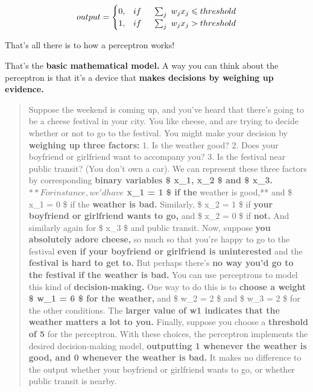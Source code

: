 \documentclass[]{article}
\begin{document}
\begin{equation}  
    output =  
    \begin{cases}
        0,& if \hspace{0.5 cm} \sum_j\ w_jx_j \leqslant threshold \\
        1,& if \hspace{0.5 cm} \sum_j\ w_jx_j > threshold 
    \end{cases}
\end{equation}

That's all there is to how a perceptron works!

That's the \textbf{basic mathematical model.} A way you can think about
the perceptron is that it's a device that \textbf{makes decisions by
weighing up evidence.}

\begin{quote}
Suppose the weekend is coming up, and you've heard that there's going to
be a cheese festival in your city. You like cheese, and are trying to
decide whether or not to go to the festival. You might make your
decision by \textbf{weighing up three factors:} 1. Is the weather good?
2. Does your boyfriend or girlfriend want to accompany you? 3. Is the
festival near public transit? (You don't own a car). We can represent
these three factors by corresponding \textbf{binary variables \$ x\_1,
x\_2 \$ and \$ x\_3. $** For instance, we'd have $ x\_1 = 1 \$ if the
}weather is good,** and \$ x\_1 = 0 \$ if the \textbf{weather is bad.}
Similarly, \$ x\_2 = 1 \$ if \textbf{your boyfriend or girlfriend wants
to go,} and \$ x\_2 = 0 \$ if \textbf{not.} And similarly again for \$
x\_3 \$ and public transit. Now, suppose \textbf{you absolutely adore
cheese,} so much so that you're happy to go to the festival \textbf{even
if your boyfriend or girlfriend is uninterested} and the
\textbf{festival is hard to get to.} But perhaps there's \textbf{no way
you'd go to the festival if the weather is bad.} You can use perceptrons
to model this kind of \textbf{decision-making.} One way to do this is to
\textbf{choose a weight \$ w\_1 = 6 \$ for the weather,} and \$ w\_2 = 2
\$ and \$ w\_3 = 2 \$ for the other conditions. The \textbf{larger value
of w1 indicates that the weather matters a lot to you.} Finally, suppose
you choose a \textbf{threshold of 5} for the perceptron. With these
choices, the perceptron implements the desired decision-making model,
\textbf{outputting 1 whenever the weather is good, and 0 whenever the
weather is bad.} It makes no difference to the output whether your
boyfriend or girlfriend wants to go, or whether public transit is
nearby.
\end{quote}
\end{document}
